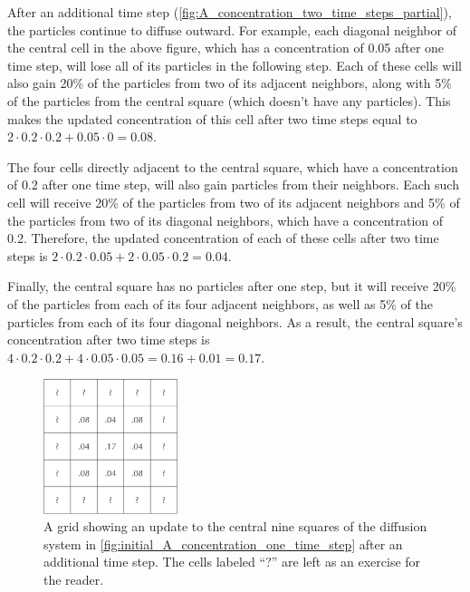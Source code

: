 \begin{note}\end{note}

After an additional time step (\autoref{fig:A_concentration_two_time_steps_partial}), the particles continue to diffuse outward. For example, each diagonal neighbor of the central cell in the above figure, which has a concentration of 0.05 after one time step, will lose all of its particles in the following step. Each of these cells will also gain 20\% of the particles from two of its adjacent neighbors, along with 5\% of the particles from the central square (which doesn't have any particles). This makes the updated concentration of this cell after two time steps equal to $2 \cdot 0.2 \cdot 0.2 + 0.05 \cdot 0 = 0.08$.

The four cells directly adjacent to the central square, which have a concentration of 0.2 after one time step, will also gain particles from their neighbors. Each such cell will receive 20\% of the particles from two of its adjacent neighbors and 5\% of the particles from two of its diagonal neighbors, which have a concentration of 0.2. Therefore, the updated concentration of each of these cells after two time steps is $2 \cdot 0.2 \cdot 0.05 + 2 \cdot 0.05 \cdot 0.2 = 0.04$.

Finally, the central square has no particles after one step, but it will receive 20\% of the particles from each of its four adjacent neighbors, as well as 5\% of the particles from each of its four diagonal neighbors. As a result, the central square's concentration after two time steps is $4 \cdot 0.2 \cdot 0.2 + 4 \cdot 0.05 \cdot 0.05 = 0.16 + 0.01 = 0.17$.\\

\begin{figure}[h]
\centering
\mySfFamily
\includegraphics[width = 0.35\textwidth]{../images/A_concentration_two_time_steps_partial.png}
\caption{A grid showing an update to the central nine squares of the diffusion system in \autoref{fig:initial_A_concentration_one_time_step} after an additional time step. The cells labeled ``?'' are left as an exercise for the reader.}
\label{fig:A_concentration_two_time_steps_partial}
\end{figure}

